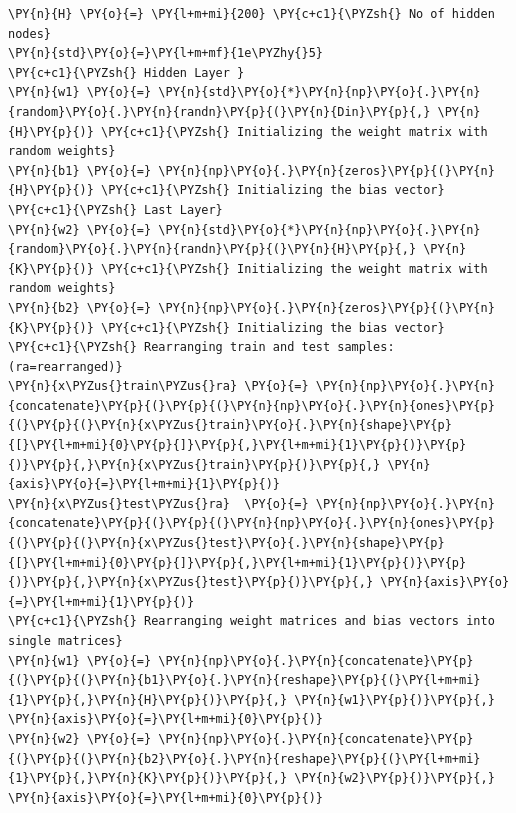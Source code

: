 \documentclass[a4paper,11pt]{article}%
\begin{document}
\begin{tcolorbox}[breakable, size=fbox, boxrule=1pt, pad at break*=1mm,colback=cellbackground, colframe=cellborder]
\begin{Verbatim}[commandchars=\\\{\}]
\PY{n}{H} \PY{o}{=} \PY{l+m+mi}{200} \PY{c+c1}{\PYZsh{} No of hidden nodes}
\PY{n}{std}\PY{o}{=}\PY{l+m+mf}{1e\PYZhy{}5} 
\PY{c+c1}{\PYZsh{} Hidden Layer }
\PY{n}{w1} \PY{o}{=} \PY{n}{std}\PY{o}{*}\PY{n}{np}\PY{o}{.}\PY{n}{random}\PY{o}{.}\PY{n}{randn}\PY{p}{(}\PY{n}{Din}\PY{p}{,} \PY{n}{H}\PY{p}{)} \PY{c+c1}{\PYZsh{} Initializing the weight matrix with random weights}
\PY{n}{b1} \PY{o}{=} \PY{n}{np}\PY{o}{.}\PY{n}{zeros}\PY{p}{(}\PY{n}{H}\PY{p}{)} \PY{c+c1}{\PYZsh{} Initializing the bias vector}
\PY{c+c1}{\PYZsh{} Last Layer}
\PY{n}{w2} \PY{o}{=} \PY{n}{std}\PY{o}{*}\PY{n}{np}\PY{o}{.}\PY{n}{random}\PY{o}{.}\PY{n}{randn}\PY{p}{(}\PY{n}{H}\PY{p}{,} \PY{n}{K}\PY{p}{)} \PY{c+c1}{\PYZsh{} Initializing the weight matrix with random weights}
\PY{n}{b2} \PY{o}{=} \PY{n}{np}\PY{o}{.}\PY{n}{zeros}\PY{p}{(}\PY{n}{K}\PY{p}{)} \PY{c+c1}{\PYZsh{} Initializing the bias vector}
\PY{c+c1}{\PYZsh{} Rearranging train and test samples: (ra=rearranged)}
\PY{n}{x\PYZus{}train\PYZus{}ra} \PY{o}{=} \PY{n}{np}\PY{o}{.}\PY{n}{concatenate}\PY{p}{(}\PY{p}{(}\PY{n}{np}\PY{o}{.}\PY{n}{ones}\PY{p}{(}\PY{p}{(}\PY{n}{x\PYZus{}train}\PY{o}{.}\PY{n}{shape}\PY{p}{[}\PY{l+m+mi}{0}\PY{p}{]}\PY{p}{,}\PY{l+m+mi}{1}\PY{p}{)}\PY{p}{)}\PY{p}{,}\PY{n}{x\PYZus{}train}\PY{p}{)}\PY{p}{,} \PY{n}{axis}\PY{o}{=}\PY{l+m+mi}{1}\PY{p}{)}
\PY{n}{x\PYZus{}test\PYZus{}ra}  \PY{o}{=} \PY{n}{np}\PY{o}{.}\PY{n}{concatenate}\PY{p}{(}\PY{p}{(}\PY{n}{np}\PY{o}{.}\PY{n}{ones}\PY{p}{(}\PY{p}{(}\PY{n}{x\PYZus{}test}\PY{o}{.}\PY{n}{shape}\PY{p}{[}\PY{l+m+mi}{0}\PY{p}{]}\PY{p}{,}\PY{l+m+mi}{1}\PY{p}{)}\PY{p}{)}\PY{p}{,}\PY{n}{x\PYZus{}test}\PY{p}{)}\PY{p}{,} \PY{n}{axis}\PY{o}{=}\PY{l+m+mi}{1}\PY{p}{)}
\PY{c+c1}{\PYZsh{} Rearranging weight matrices and bias vectors into single matrices}
\PY{n}{w1} \PY{o}{=} \PY{n}{np}\PY{o}{.}\PY{n}{concatenate}\PY{p}{(}\PY{p}{(}\PY{n}{b1}\PY{o}{.}\PY{n}{reshape}\PY{p}{(}\PY{l+m+mi}{1}\PY{p}{,}\PY{n}{H}\PY{p}{)}\PY{p}{,} \PY{n}{w1}\PY{p}{)}\PY{p}{,} \PY{n}{axis}\PY{o}{=}\PY{l+m+mi}{0}\PY{p}{)}
\PY{n}{w2} \PY{o}{=} \PY{n}{np}\PY{o}{.}\PY{n}{concatenate}\PY{p}{(}\PY{p}{(}\PY{n}{b2}\PY{o}{.}\PY{n}{reshape}\PY{p}{(}\PY{l+m+mi}{1}\PY{p}{,}\PY{n}{K}\PY{p}{)}\PY{p}{,} \PY{n}{w2}\PY{p}{)}\PY{p}{,} \PY{n}{axis}\PY{o}{=}\PY{l+m+mi}{0}\PY{p}{)}
\end{Verbatim}
\end{tcolorbox}
\end{document}
